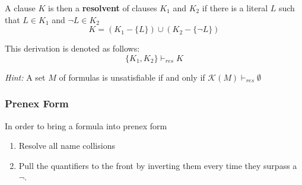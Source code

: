 \documentclass[11pt]{article}
\begin{document}
A clause $K$ is then a \textbf{resolvent} of clauses $K_1$ and $K_2$ if there is a literal $L$ such that $L \in K_1$ and $\neg L \in K_2$
\begin{equation*}
	K = (K_1 - \{L\}) \cup (K_2 - \{\neg L\})
\end{equation*}

This derivation is denoted as follows:
\begin{equation*}
	\{K_1, K_2\} \vdash_{res} K
\end{equation*}

\emph{Hint:} A set $M$ of formulas is unsatisfiable if and only if $\mathcal{K}(M) \vdash_{res} \emptyset$

\subsubsection{Prenex Form}

In order to bring a formula into prenex form
\begin{enumerate}[labelindent=16pt,style=multiline,leftmargin=1.5cm, noitemsep]
	\item Resolve all name collisions
	\item Pull the quantifiers to the front by inverting them every time they surpass a $\neg$.
\end{enumerate}
\end{document}

